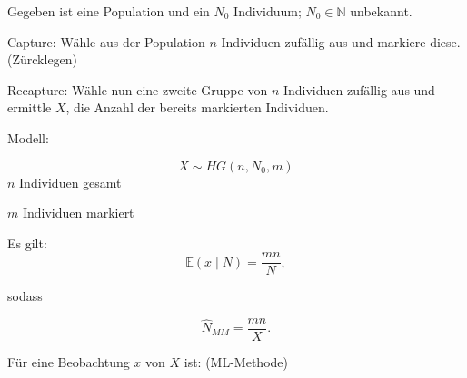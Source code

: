 \documentclass[10pt]{article}
\newcommand{\EW}{\mathbb{E}} %
\newenvironment{BSP}[1][]
{\begin{Beispiel}[frametitle=#1]}{\end{Beispiel}}
\begin{document}
	\begin{BSP}[Beispiel 1.0000 Schätzung der Populationsgröße mit der Capture/Recapture-Methode]
		Gegeben ist eine Population und ein $N_0$ Individuum; $N_0 \in \mathbb{N}$ unbekannt. 
		
		Capture: Wähle aus der Population $n$ Individuen zufällig aus und markiere diese. (Zürcklegen)
		
		Recapture: Wähle nun eine zweite Gruppe von $n$ Individuen zufällig aus und ermittle $X$, die Anzahl der bereits markierten Individuen. 
		
		Modell:
		
		\begin{equation*}
			X \sim HG(n,N_0,m)
		\end{equation*}
		$n$ Individuen gesamt
		
		$m$ Individuen markiert
		
		Es gilt:
		\begin{equation*}
			\EW(x \mid N) = \frac{mn}{N},
		\end{equation*}
		
		sodass
		
		\begin{equation*}
			\hat{N}_{MM}=\frac{mn}{X}.
		\end{equation*}
		
		Für eine Beobachtung $x$ von $X$ ist: (ML-Methode)
		

\end{BSP}
\end{document}
